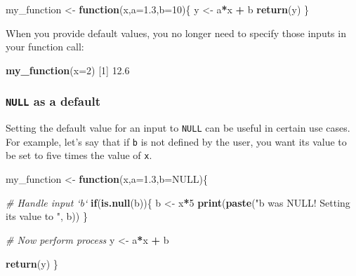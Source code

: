 \documentclass[
]{book}
\newenvironment{Shaded}{\begin{snugshade}}{\end{snugshade}}
\newcommand{\CommentTok}[1]{\textcolor[rgb]{0.56,0.35,0.01}{\textit{#1}}}
\newcommand{\ControlFlowTok}[1]{\textcolor[rgb]{0.13,0.29,0.53}{\textbf{#1}}}
\newcommand{\DataTypeTok}[1]{\textcolor[rgb]{0.13,0.29,0.53}{#1}}
\newcommand{\DecValTok}[1]{\textcolor[rgb]{0.00,0.00,0.81}{#1}}
\newcommand{\FloatTok}[1]{\textcolor[rgb]{0.00,0.00,0.81}{#1}}
\newcommand{\KeywordTok}[1]{\textcolor[rgb]{0.13,0.29,0.53}{\textbf{#1}}}
\newcommand{\NormalTok}[1]{#1}
\newcommand{\OperatorTok}[1]{\textcolor[rgb]{0.81,0.36,0.00}{\textbf{#1}}}
\newcommand{\OtherTok}[1]{\textcolor[rgb]{0.56,0.35,0.01}{#1}}
\newcommand{\StringTok}[1]{\textcolor[rgb]{0.31,0.60,0.02}{#1}}
\begin{document}
\begin{Shaded}
\begin{Highlighting}[]
\NormalTok{my_function <-}\StringTok{ }\ControlFlowTok{function}\NormalTok{(x,}\DataTypeTok{a=}\FloatTok{1.3}\NormalTok{,}\DataTypeTok{b=}\DecValTok{10}\NormalTok{)\{}
\NormalTok{  y <-}\StringTok{ }\NormalTok{a}\OperatorTok{*}\NormalTok{x }\OperatorTok{+}\StringTok{ }\NormalTok{b}
  \KeywordTok{return}\NormalTok{(y)}
\NormalTok{\}}
\end{Highlighting}
\end{Shaded}

When you provide default values, you no longer need to specify those inputs in your function call:

\begin{Shaded}
\begin{Highlighting}[]
\KeywordTok{my_function}\NormalTok{(}\DataTypeTok{x=}\DecValTok{2}\NormalTok{)}
\NormalTok{[}\DecValTok{1}\NormalTok{] }\FloatTok{12.6}
\end{Highlighting}
\end{Shaded}

\hypertarget{null-as-a-default}{%
\subsubsection*{\texorpdfstring{\texttt{NULL} as a default}{NULL as a default}}\label{null-as-a-default}}

Setting the default value for an input to \texttt{NULL} can be useful in certain use cases. For example, let's say that if \texttt{b} is not defined by the user, you want its value to be set to five times the value of \texttt{x}.

\begin{Shaded}
\begin{Highlighting}[]
\NormalTok{my_function <-}\StringTok{ }\ControlFlowTok{function}\NormalTok{(x,}\DataTypeTok{a=}\FloatTok{1.3}\NormalTok{,}\DataTypeTok{b=}\OtherTok{NULL}\NormalTok{)\{}
  
  \CommentTok{# Handle input `b`}
  \ControlFlowTok{if}\NormalTok{(}\KeywordTok{is.null}\NormalTok{(b))\{}
\NormalTok{    b <-}\StringTok{ }\NormalTok{x}\OperatorTok{*}\DecValTok{5}
    \KeywordTok{print}\NormalTok{(}\KeywordTok{paste}\NormalTok{(}\StringTok{"b was NULL! Setting its value to "}\NormalTok{, b))}
\NormalTok{  \}}
  
  \CommentTok{# Now perform process}
\NormalTok{  y <-}\StringTok{ }\NormalTok{a}\OperatorTok{*}\NormalTok{x }\OperatorTok{+}\StringTok{ }\NormalTok{b}
  
  \KeywordTok{return}\NormalTok{(y)}
\NormalTok{\}}
\end{Highlighting}
\end{Shaded}
\end{document}
